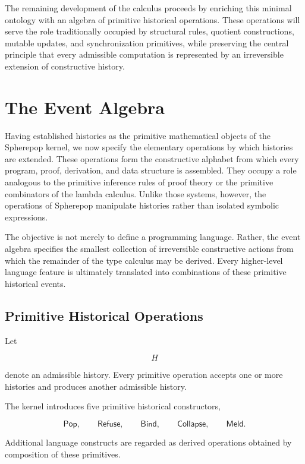 \documentclass[12pt,oneside]{article}
\theoremstyle{definition}
\theoremstyle{remark}
\newcommand{\Pop}{\mathsf{Pop}}
\newcommand{\Refuse}{\mathsf{Refuse}}
\newcommand{\Bind}{\mathsf{Bind}}
\newcommand{\Collapse}{\mathsf{Collapse}}
\newcommand{\Meld}{\mathsf{Meld}}
\begin{document}
The remaining development of the calculus proceeds by enriching this minimal ontology with an algebra of primitive historical operations. These operations will serve the role traditionally occupied by structural rules, quotient constructions, mutable updates, and synchronization primitives, while preserving the central principle that every admissible computation is represented by an irreversible extension of constructive history.

\section{The Event Algebra}

Having established histories as the primitive mathematical objects of the
Spherepop kernel, we now specify the elementary operations by which histories
are extended. These operations form the constructive alphabet from which every
program, proof, derivation, and data structure is assembled. They occupy a role
analogous to the primitive inference rules of proof theory or the primitive
combinators of the lambda calculus. Unlike those systems, however, the
operations of Spherepop manipulate histories rather than isolated symbolic
expressions.

The objective is not merely to define a programming language. Rather, the event
algebra specifies the smallest collection of irreversible constructive actions
from which the remainder of the type calculus may be derived. Every higher-level
language feature is ultimately translated into combinations of these primitive
historical events.

\subsection{Primitive Historical Operations}

Let

\[
H
\]

denote an admissible history. Every primitive operation accepts one or more
histories and produces another admissible history.

The kernel introduces five primitive historical constructors,

\[
\Pop,
\qquad
\Refuse,
\qquad
\Bind,
\qquad
\Collapse,
\qquad
\Meld.
\]

Additional language constructs are regarded as derived operations obtained by
composition of these primitives.
\end{document}
